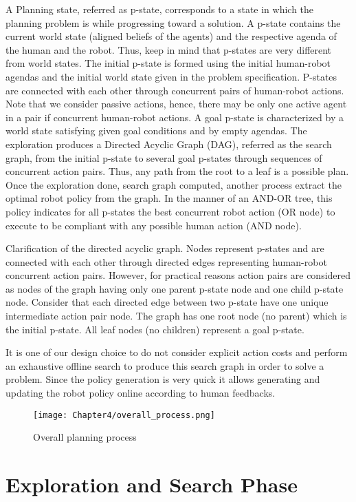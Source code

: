 A Planning state, referred as p-state, corresponds to a state in which the planning problem is while progressing toward a solution. A p-state contains the current world state (aligned beliefs of the agents) and the respective agenda of the human and the robot. Thus, keep in mind that p-states are very different from world states.
The initial p-state is formed using the initial human-robot agendas and the initial world state given in the problem specification. P-states are connected with each other through concurrent pairs of human-robot actions. Note that we consider passive actions, hence, there may be only one active agent in a pair if concurrent human-robot actions. A goal p-state is characterized by a world state satisfying given goal conditions and by empty agendas.
The exploration produces a Directed Acyclic Graph (DAG), referred as the search graph, from the initial p-state to several goal p-states through sequences of concurrent action pairs. Thus, any path from the root to a leaf is a possible plan. Once the exploration done, search graph computed, another process extract the optimal robot policy from the graph. In the manner of an AND-OR tree, this policy indicates for all p-states the best concurrent robot action (OR node) to execute to be compliant with any possible human action (AND node).


Clarification of the directed acyclic graph. Nodes represent p-states and are connected with each other through directed edges representing human-robot concurrent action pairs. However, for practical reasons action pairs are considered as nodes of the graph having only one parent p-state node and one child p-state node. Consider that each directed edge between two p-state have one unique intermediate action pair node. The graph has one root node (no parent) which is the initial p-state. All leaf nodes (no children) represent a goal p-state. 

It is one of our design choice to do not consider explicit action costs and perform an exhaustive offline search to produce this search graph in order to solve a problem. Since the policy generation is very quick it allows generating and updating the robot policy online according to human feedbacks. 


\begin{figure}
    \texttt{[image: Chapter4/overall\_process.png]}
    \caption{Overall planning process}
    \label{fig:overall_process}
\end{figure}

\section{Exploration and Search Phase}

